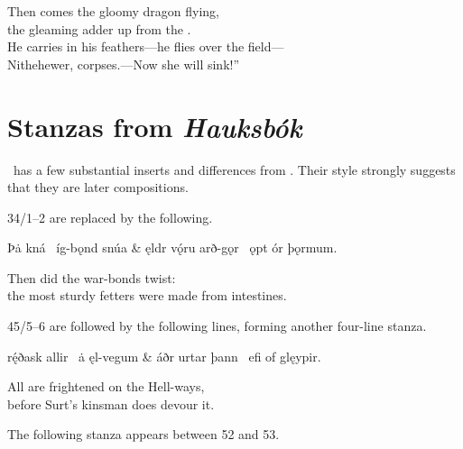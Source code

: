 \bvb Then comes the gloomy dragon flying, \\
the gleaming adder up from the . \\
He carries in his feathers—he flies over the field— \\
Nithehewer, corpses.—Now she will sink!”\evb\evg

\sectionline

\section{Stanzas from \emph{Hauksbók}}

{\small \Hauksbok\ has a few substantial inserts and differences from \Regius.  Their style strongly suggests that they are later compositions.}

\sectionline

{\small 34/1–2 are replaced by the following.}

\bvg\bva[H1]%
Þȧ kná  \hld\ íg-bǫnd snúa &
ęldr vǫ́ru arð-gǫr \hld\ ǫpt ór þǫrmum.\eva

\bvb Then did  the war-bonds twist: \\
the most sturdy fetters were made from intestines.\evb\evg

\sectionline

{\small 45/5–6 are followed by the following lines, forming another four-line stanza.}

\bvg\bva[H2]%
rę́ðask allir \hld\ ȧ ęl-vegum &
áðr urtar þann \hld\ efi of glęypir.\eva

\bvb All are frightened on the Hell-ways, \\
before Surt’s kinsman does devour it.\evb\evg

\sectionline

{\small The following stanza appears between 52 and 53.}

\bvg\bva[H3]%
\eva


